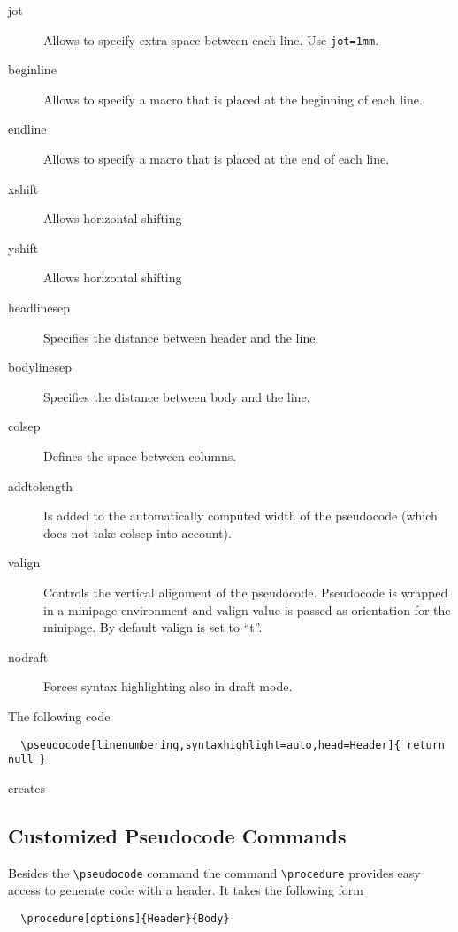 \documentclass[a4paper]{report}
\begin{document}
\begin{description}
  \item[jot]
  Allows to specify extra space between each line. Use \lstinline$jot=1mm$.
  
  \item[beginline]
  Allows to specify a macro that is placed at the beginning of each line.
  
  \item[endline]
  Allows to specify a macro that is placed at the end of each line.
  
  \item[xshift]
  Allows horizontal shifting
  \item[yshift]
  Allows horizontal shifting
  
  \item[headlinesep]
  Specifies the distance between header and the line.
  \item[bodylinesep]
  Specifies the distance between body and the line.
  \item[colsep]
  Defines the space between columns.
  \item[addtolength]
  Is added to the automatically computed width of the pseudocode (which does not take colsep into account). 
  
  \item[valign]
  Controls the vertical alignment of the pseudocode. Pseudocode is wrapped in a minipage environment and valign value is passed as orientation for the minipage. By default valign is set to \enquote{t}.
  
  \item[nodraft]
  Forces syntax highlighting also in draft mode.
  \end{description}
  The following code 
  \begin{lstlisting}
  \pseudocode[linenumbering,syntaxhighlight=auto,head=Header]{ return null }
  \end{lstlisting}
  creates 
  \begin{center}
  \end{center}
  
  \subsection{Customized Pseudocode Commands}
  
  Besides the  \lstinline{\pseudocode}  command the command  \lstinline{\procedure}
  provides easy access to generate code with a header. It takes the following form
  \begin{lstlisting}
  \procedure[options]{Header}{Body}
  \end{lstlisting}
  
\end{document}
